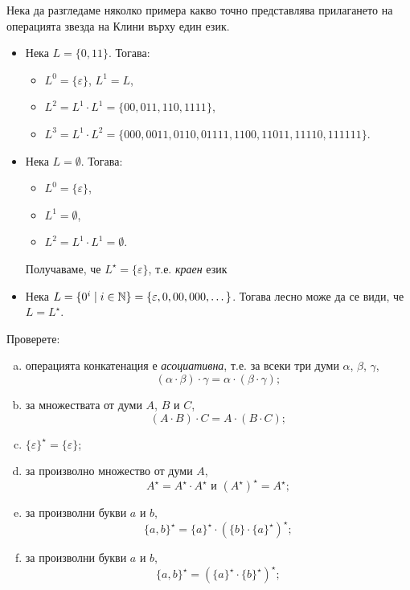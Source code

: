 \begin{example}
  Нека да разгледаме няколко примера какво точно представлява прилагането
  на операцията звезда на Клини върху един език.
  \begin{itemize}
  \item 
    Нека $L = \{0,11\}$. Тогава:
    \begin{itemize}
    \item 
      $L^0 = \{\varepsilon\}$, $L^1 = L$,
    \item
      $L^2 = L^1\cdot L^1 = \{00,011,110,1111\}$,
    \item
      $L^3 = L^1\cdot L^2 = \{000,0011,0110,01111,1100,11011,11110,111111\}$.
    \end{itemize}
  \item
    Нека $L = \emptyset$.
    Тогава:
    \begin{itemize}
    \item 
      $L^0 = \{\varepsilon\}$,
    \item
      $L^1 = \emptyset$,
    \item
      $L^2 = L^1 \cdot L^1 = \emptyset$.
    \end{itemize}    
    Получаваме, че $L^\star = \{\varepsilon\}$, т.е. {\em краен} език
  \item
    Нека $L = \{0^i\mid i \in \mathbb{N}\} = \{\varepsilon, 0, 00, 000, \dots\}$.
    Тогава лесно може да се види, че $L = L^\star$.
  \end{itemize}
\end{example}



\begin{problem}
  Проверете:
  \begin{enumerate}[a)]
  \item 
    операцията конкатенация е {\em асоциативна}, т.е. за всеки три думи $\alpha$, $\beta$, $\gamma$,
    \[(\alpha\cdot\beta)\cdot\gamma = \alpha\cdot(\beta\cdot\gamma);\]
  \item
    за множествата от думи $A$, $B$ и $C$,
    \[(A\cdot B)\cdot C = A\cdot (B\cdot C);\]
  \item
    $\{\varepsilon\}^\star = \{\varepsilon\}$;
  \item
    за произволно множество от думи $A$,
    \[A^\star = A^\star\cdot A^\star\text{ и }(A^\star)^\star = A^\star;\]
  \item
    за произволни букви $a$ и $b$,
    \[\{a,b\}^\star = \{a\}^\star\cdot(\{b\}\cdot\{a\}^\star)^\star;\]
  \item
    за произволни букви $a$ и $b$,
    \[\{a,b\}^\star = (\{a\}^\star\cdot \{b\}^\star)^\star;\]
  \end{enumerate}
\end{problem}


